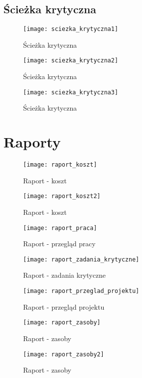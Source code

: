 \section{Ścieżka krytyczna}
\begin{figure}[H]
\centering
  \texttt{[image: sciezka\_krytyczna1]}
  \caption{Ścieżka krytyczna}
  \label{sciezka_krytyczna1}
\end{figure}
\begin{figure}[H]
\centering
  \texttt{[image: sciezka\_krytyczna2]}
  \caption{Ścieżka krytyczna}
  \label{sciezka_krytyczna2}
\end{figure}
\begin{figure}[H]
\centering
  \texttt{[image: sciezka\_krytyczna3]}
  \caption{Ścieżka krytyczna}
  \label{sciezka_krytyczna3}
\end{figure}
\chapter{Raporty}
\begin{figure}[H]
\centering
  \texttt{[image: raport\_koszt]}
  \caption{Raport - koszt}
  \label{raport_koszt}
\end{figure}
\begin{figure}[H]
\centering
  \texttt{[image: raport\_koszt2]}
  \caption{Raport - koszt}
  \label{raport_koszt}
\end{figure}
\begin{figure}[H]
\centering
  \texttt{[image: raport\_praca]}
  \caption{Raport - przegląd pracy}
  \label{raport_praca}
\end{figure}

\begin{figure}[H]
\centering
  \texttt{[image: raport\_zadania\_krytyczne]}
  \caption{Raport - zadania krytyczne}
  \label{raport_zadania_krytyczne}
\end{figure}

\begin{figure}[H]
\centering
  \texttt{[image: raport\_przeglad\_projektu]}
  \caption{Raport - przegląd projektu}
  \label{raport_przeglad_projektu}
\end{figure}

\begin{figure}[H]
\centering
  \texttt{[image: raport\_zasoby]}
  \caption{Raport - zasoby}
  \label{raport_zadania_krytyczne}
\end{figure}
\begin{figure}[H]
\centering
  \texttt{[image: raport\_zasoby2]}
  \caption{Raport - zasoby}
  \label{raport_zadania_krytyczne}
\end{figure}
